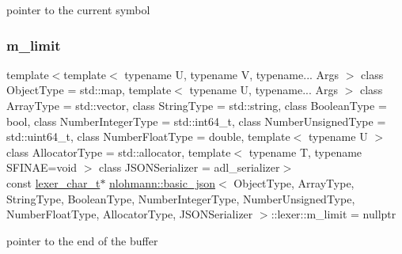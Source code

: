 pointer to the current symbol 

\mbox{\label{classnlohmann_1_1basic__json_1_1lexer_a460d53a59d243782845ab6571e53dcc1}} 
\subsubsection{\texorpdfstring{m\+\_\+limit}{m\_limit}}
{\footnotesize\ttfamily template$<$template$<$ typename U, typename V, typename... Args $>$ class Object\+Type = std\+::map, template$<$ typename U, typename... Args $>$ class Array\+Type = std\+::vector, class String\+Type  = std\+::string, class Boolean\+Type  = bool, class Number\+Integer\+Type  = std\+::int64\+\_\+t, class Number\+Unsigned\+Type  = std\+::uint64\+\_\+t, class Number\+Float\+Type  = double, template$<$ typename U $>$ class Allocator\+Type = std\+::allocator, template$<$ typename T, typename S\+F\+I\+N\+A\+E=void $>$ class J\+S\+O\+N\+Serializer = adl\+\_\+serializer$>$ \\
const \hyperlink{classnlohmann_1_1basic__json_1_1lexer_abe04be04d0575249f8806c334bacbc80}{lexer\+\_\+char\+\_\+t}$\ast$ \hyperlink{classnlohmann_1_1basic__json}{nlohmann\+::basic\+\_\+json}$<$ Object\+Type, Array\+Type, String\+Type, Boolean\+Type, Number\+Integer\+Type, Number\+Unsigned\+Type, Number\+Float\+Type, Allocator\+Type, J\+S\+O\+N\+Serializer $>$\+::lexer\+::m\+\_\+limit = nullptr\hspace{0.3cm}{\ttfamily [private]}}



pointer to the end of the buffer 

\mbox{\label{classnlohmann_1_1basic__json_1_1lexer_aeba256e545e3362795f90bf3aafe18d5}} 
